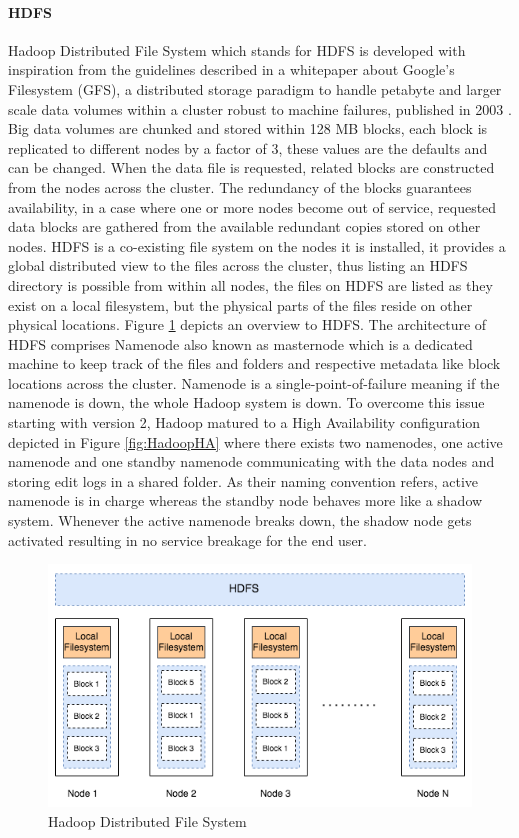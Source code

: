 \documentclass[review]{elsarticle}
\begin{document}
\paragraph{HDFS}Hadoop Distributed File System which stands for HDFS is developed with inspiration from the guidelines described in a whitepaper about Google's Filesystem (GFS), a distributed storage paradigm to handle petabyte and larger scale data volumes within a cluster robust to machine failures, published in 2003 \cite{ghemawat_google_2003}. Big data volumes are chunked and stored within 128 MB blocks, each block is replicated to different nodes by a factor of 3, these values are the defaults and can be changed. When the data file is requested, related blocks are constructed from the nodes across the cluster. The redundancy of the blocks guarantees availability, in a case where one or more nodes become out of service, requested data blocks are gathered from the available redundant copies stored on other nodes. HDFS is a co-existing file system on the nodes it is installed, it provides a global distributed view to the files across the cluster, thus listing an HDFS directory is possible from within all nodes, the files on HDFS are listed as they exist on a local filesystem, but the physical parts of the files reside on other physical locations. Figure \ref{fig:HDFSoverview} depicts an overview to HDFS. The architecture of HDFS comprises Namenode also known as masternode which is a dedicated machine to keep track of the files and folders and respective metadata like block locations across the cluster. Namenode is a single-point-of-failure meaning if the namenode is down, the whole Hadoop system is down. To overcome this issue starting with version 2, Hadoop matured to a High Availability configuration depicted in Figure \ref{fig:HadoopHA} where there exists two namenodes, one active namenode and one standby namenode communicating with the data nodes and storing edit logs in a shared folder. As their naming convention refers, active namenode is in charge whereas the standby node behaves more like a shadow system. Whenever the active namenode breaks down, the shadow node gets activated resulting in no service breakage for the end user.


\begin{figure}[h!]
	\includegraphics[width=\textwidth]{HDFSoverview}
	\caption{Hadoop Distributed File System}
	\label{fig:HDFSoverview}
	\centering
\end{figure}
\end{document}
